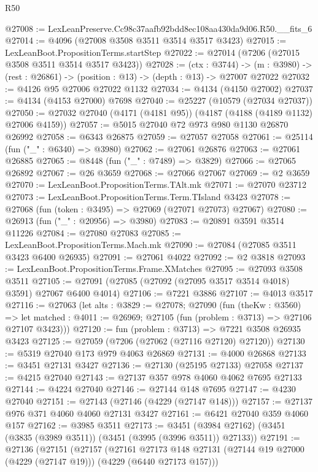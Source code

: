 \begin{lexlean}{R50}
\begin{coremodule}
@27008 := LexLeanPreserve.Cc98c37aafb92bdd8ec108aa430da9d06.R50.__fits_6
@27014 := @4096 (@27008 @3508 @3511 @3514 @3517 @3423)
@27015 := LexLeanBoot.PropositionTerms.startStep
@27022 := @27014 (@7206 (@27015 @3508 @3511 @3514 @3517 @3423))
@27028 := (ctx : @3744) ->
  (m : @3980) -> (rest : @26861) -> (position : @13) -> (depth : @13) -> @27007 @27022
@27032 := @4126 @95 @27006 @27022 @1132
@27034 := @4134 (@4150 @27002)
@27037 := @4134 (@4153 @27000) @7698
@27040 := @25227 (@10579 (@27034 @27037))
@27050 := @27032 @27040 (@4171 (@4181 @95)) (@4187 (@4188 (@4189 @1132) @27006 @4159))
@27057 := @5015 @27040 @72 @973 @980 @1130 @26870 @26992
@27058 := @6343 @26875
@27059 := @27057 @27058
@27061 := @25114 (fun ("_" : @6340) => @3980)
@27062 := @27061 @26876
@27063 := @27061 @26885
@27065 := @8448 (fun ("_" : @7489) => @3829)
@27066 := @27065 @26892
@27067 := @26 @3659
@27068 := @27066 @27067
@27069 := @2 @3659
@27070 := LexLeanBoot.PropositionTerms.TAlt.mk
@27071 := @27070 @23712
@27073 := LexLeanBoot.PropositionTerms.Term.TIsland @3423
@27078 := @27068 (fun (token : @3495) => @27069 (@27071 @27073) @27067)
@27080 := @26913 (fun ("_" : @20956) => @3980)
@27083 := @20891 @3591 @3514 @11226
@27084 := @27080 @27083
@27085 := LexLeanBoot.PropositionTerms.Mach.mk
@27090 := @27084 (@27085 @3511 @3423 @6400 @26935)
@27091 := @27061 @4022
@27092 := @2 @3818
@27093 := LexLeanBoot.PropositionTerms.Frame.XMatches
@27095 := @27093 @3508 @3511
@27105 := @27091 (@27085 (@27092 (@27095 @3517 @3514 @4018) @3591) @27067 @6400 @4014)
@27106 := @7221 @3886
@27107 := @4013 @3517
@27116 := @27063
    (let alts : @3829 := @27078;
    @27090
      (fun (theKw : @3560) =>
      let matched : @4011 := @26969; @27105 (fun (problem : @3713) => @27106 @27107 @3423)))
@27120 := fun (problem : @3713) => @7221 @3508 @26935 @3423
@27125 := @27059 (@7206 (@27062 (@27116 @27120) @27120))
@27130 := @5319 @27040 @173 @979 @4063 @26869
@27131 := @4000 @26868
@27133 := @3451 @27131 @3427
@27136 := @27130 (@25195 @27133) @27058
@27137 := @4215 @27040
@27143 := @27137 @357 @978 @4060 @4062 @7695 @27133
@27144 := @4224 @27040
@27146 := @27144 @148 @7695
@27147 := @4230 @27040
@27151 := @27143 (@27146 (@4229 (@27147 @148)))
@27157 := @27137 @976 @371 @4060 @4060 @27131 @3427
@27161 := @6421 @27040 @359 @4060 @157
@27162 := @3985 @3511
@27173 := @3451 (@3984 @27162) (@3451 (@3835 (@3989 @3511)) (@3451 (@3995 (@3996 @3511)) @27133))
@27191 := @27136
    (@27151
      (@27157
        (@27161
          @27173
          @148
          @27131
          (@27144 @19 @27000 (@4229 (@27147 @19)))
          (@4229 (@6440 @27173 @157)))

\end{coremodule}
\end{lexlean}
